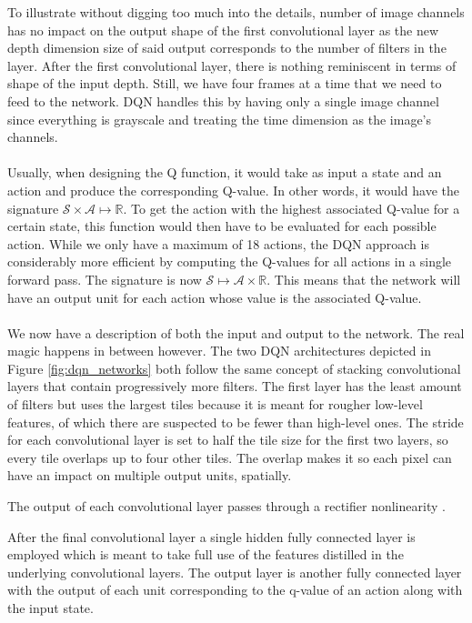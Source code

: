 To illustrate without digging too much into the details,
number of image channels has no impact on the output shape of the
first convolutional layer as the new depth dimension size
of said output corresponds to the number of filters in the layer.
After the first convolutional layer,
there is nothing reminiscent in terms of shape
of the input depth.
Still, we have four frames at a time that we need to feed to the network.
DQN handles this by having only a single image channel
since everything is grayscale
and treating the time dimension as the image's channels.

\paragraph{}
Usually, when designing the Q function,
it would take as input a state and an action and produce
the corresponding Q-value.
In other words,
it would have the signature
$\mathcal{S} \times \mathcal{A} \mapsto \mathbb{R}$.
To get the action with the highest associated Q-value
for a certain state,
this function would then have to be evaluated
for each possible action.
While we only have a maximum of 18 actions,
the DQN approach is considerably more efficient
by computing the Q-values for all actions in a single forward pass.
The signature is now
$\mathcal{S} \mapsto \mathcal{A} \times \mathbb{R}$.
This means that the network will have an output unit
for each action whose value is the associated Q-value.

\paragraph{}
We now have a description of both the input and output to the network.
The real magic happens in between however.
The two DQN architectures depicted in Figure \ref{fig:dqn_networks}
both follow the same concept
of stacking convolutional layers that
contain progressively more filters.
The first layer has the least amount of filters but uses the largest tiles
because it is meant for rougher low-level features,
of which there are suspected to be fewer than high-level ones.
The stride for each convolutional layer is set
to half the tile size for the first two layers,
so every tile overlaps up to four other tiles.
The overlap makes it so each pixel can have an impact
on multiple output units, spatially.

The output of each convolutional layer passes through a rectifier
nonlinearity \parencite{Nair2010}.

After the final convolutional layer
a single hidden fully connected layer is employed
which is meant to take full use of the features distilled
in the underlying convolutional layers.
The output layer is another fully connected layer
with the output of each unit corresponding to the q-value of an action
along with the input state.

